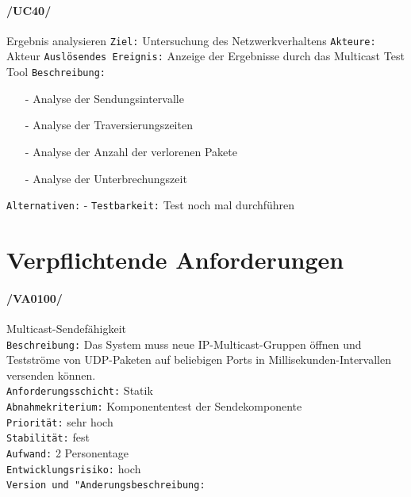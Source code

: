 \paragraph{/UC40/} Ergebnis analysieren\newline
\texttt{Ziel:} Untersuchung des Netzwerkverhaltens\newline
\texttt{Akteure:} Akteur\newline
\texttt{Auslösendes Ereignis:} Anzeige der Ergebnisse durch das
Multicast Test Tool\newline
\texttt{Beschreibung:}
\begin{itemize}
  \item[-] Analyse der Sendungsintervalle
  \item[-] Analyse der Traversierungszeiten
  \item[-] Analyse der Anzahl der verlorenen Pakete
  \item[-] Analyse der Unterbrechungszeit
\end{itemize}
\texttt{Alternativen:} -\newline
\texttt{Testbarkeit:} Test noch mal durchführen\newline

\clearpage

\section{Verpflichtende Anforderungen}
\label{sec:mandatory}

\paragraph{/VA0100/} Multicast-Sendefähigkeit\\
\texttt{Beschreibung:} Das System muss neue IP-Multicast-Gruppen öffnen und
Testströme von UDP-Paketen auf beliebigen Ports in Millisekunden-Intervallen
versenden können.\\
\texttt{Anforderungsschicht:} Statik\\
\texttt{Abnahmekriterium:} Komponententest der Sendekomponente\\
\texttt{Priorität:} sehr hoch\\
\texttt{Stabilität:} fest\\
\texttt{Aufwand:} 2 Personentage\\
\texttt{Entwicklungsrisiko:} hoch\\
\texttt{Version und "Anderungsbeschreibung:}


